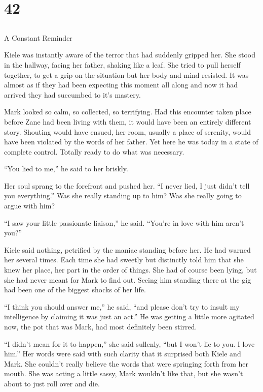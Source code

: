 \chapter{42}
\section{}
A Constant Reminder  

Kiele was instantly aware of the terror that had suddenly gripped her.  She stood in the hallway, facing her father, shaking like a leaf.  She tried to pull herself together, to get a grip on the situation but her body and mind resisted.  It was almost as if they had been expecting this moment all along and now it had arrived they had succumbed to it's mastery.  

Mark looked so calm, so collected, so terrifying.  Had this encounter taken place before Zane had been living with them, it would have been an entirely different story.  Shouting would have ensued, her room, usually a place of serenity, would have been violated by the words of her father.  Yet here he was today in a state of complete control.  Totally ready to do what was necessary.

``You lied to me,'' he said to her briskly.

Her soul sprang to the forefront and pushed her.  ``I never lied, I just didn't tell you everything.''  Was she really standing up to him?  Was she really going to argue with him?

``I saw your little passionate liaison,'' he said.  ``You're in love with him aren't you?''

Kiele said nothing, petrified by the maniac standing before her.  He had warned her several times.  Each time she had sweetly but distinctly told him that she knew her place, her part in the order of things.  She had of course been lying, but she had never meant for Mark to find out.  Seeing him standing there at the gig had been one of the biggest shocks of her life.

``I think you should answer me,'' he said, ``and please don't try to insult my intelligence by claiming it was just an act.''  He was getting a little more agitated now, the pot that was Mark, had most definitely been stirred.

``I didn't mean for it to happen,'' she said sullenly, ``but I won't lie to you.  I love him.''  Her words were said with such clarity that it surprised both Kiele and Mark.  She couldn't really believe the words that were springing forth from her mouth.  She was acting a little sassy, Mark wouldn't like that, but she wasn't about to just roll over and die. 

